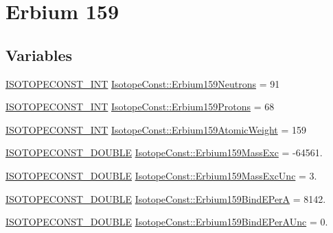 \hypertarget{group___isotope_const-_erbium-_er159}{}\section{Erbium 159}
\label{group___isotope_const-_erbium-_er159}
\subsection*{Variables}
\begin{DoxyCompactItemize}
\item 
\mbox{\hyperlink{group___isotope_const-_macros_ga5f18360b3e99483a35c32d789e62621c}{I\+S\+O\+T\+O\+P\+E\+C\+O\+N\+S\+T\+\_\+\+I\+NT}} \mbox{\hyperlink{group___isotope_const-_erbium-_er159_gae5de86e030b7ba04cde36f9ab64b56a5}{Isotope\+Const\+::\+Erbium159\+Neutrons}} = 91
\item 
\mbox{\hyperlink{group___isotope_const-_macros_ga5f18360b3e99483a35c32d789e62621c}{I\+S\+O\+T\+O\+P\+E\+C\+O\+N\+S\+T\+\_\+\+I\+NT}} \mbox{\hyperlink{group___isotope_const-_erbium-_er159_gacbd70b00173f4364ced4df270a5563ff}{Isotope\+Const\+::\+Erbium159\+Protons}} = 68
\item 
\mbox{\hyperlink{group___isotope_const-_macros_ga5f18360b3e99483a35c32d789e62621c}{I\+S\+O\+T\+O\+P\+E\+C\+O\+N\+S\+T\+\_\+\+I\+NT}} \mbox{\hyperlink{group___isotope_const-_erbium-_er159_ga996d33727f427494376e68477ad9141d}{Isotope\+Const\+::\+Erbium159\+Atomic\+Weight}} = 159
\item 
\mbox{\hyperlink{group___isotope_const-_macros_ga8f45a7272ce02c0b4c65c44636ed719a}{I\+S\+O\+T\+O\+P\+E\+C\+O\+N\+S\+T\+\_\+\+D\+O\+U\+B\+LE}} \mbox{\hyperlink{group___isotope_const-_erbium-_er159_ga46089f4a950da64af4e4ea67a6abf358}{Isotope\+Const\+::\+Erbium159\+Mass\+Exc}} = -\/64561.
\item 
\mbox{\hyperlink{group___isotope_const-_macros_ga8f45a7272ce02c0b4c65c44636ed719a}{I\+S\+O\+T\+O\+P\+E\+C\+O\+N\+S\+T\+\_\+\+D\+O\+U\+B\+LE}} \mbox{\hyperlink{group___isotope_const-_erbium-_er159_ga9839360025e7e533fed40ade6ed13292}{Isotope\+Const\+::\+Erbium159\+Mass\+Exc\+Unc}} = 3.
\item 
\mbox{\hyperlink{group___isotope_const-_macros_ga8f45a7272ce02c0b4c65c44636ed719a}{I\+S\+O\+T\+O\+P\+E\+C\+O\+N\+S\+T\+\_\+\+D\+O\+U\+B\+LE}} \mbox{\hyperlink{group___isotope_const-_erbium-_er159_ga85a2a13bac5bc88018b1b46ef391cc6e}{Isotope\+Const\+::\+Erbium159\+Bind\+E\+PerA}} = 8142.
\item 
\mbox{\hyperlink{group___isotope_const-_macros_ga8f45a7272ce02c0b4c65c44636ed719a}{I\+S\+O\+T\+O\+P\+E\+C\+O\+N\+S\+T\+\_\+\+D\+O\+U\+B\+LE}} \mbox{\hyperlink{group___isotope_const-_erbium-_er159_ga055dc642e0ca6c4e529f4b2fbc149b08}{Isotope\+Const\+::\+Erbium159\+Bind\+E\+Per\+A\+Unc}} = 0.

\end{DoxyCompactItemize}
